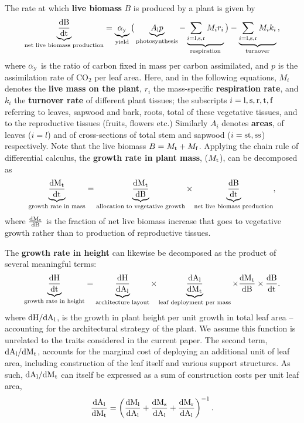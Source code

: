\documentclass[a4paper,11pt]{article}
\begin{document}
The rate at which \textbf{live biomass} $B$ is produced by a plant is given by
\begin{equation}\label{eq:eq0}
\underbrace{\frac{\rm{d} B}{\rm{d} t}}_{\text{net live biomass production}} = \underbrace{\alpha_{\rm y}}_{\text{yield}}  \big(\underbrace{A_{\rm l} p}_{\text{photosynthesis}} - \underbrace{\sum_{i = {\rm l,s,r}} M_{i} r_{i}}_{\text{respiration}}\big) - \underbrace{ \sum_{i = \rm{l,s,r}} M_{i} k_{i}}_{\text{turnover}} \, ,
\end{equation}
where $\alpha_{\rm y}$ is the ratio of carbon fixed in mass per carbon assimilated, and $p$ is the assimilation rate of CO$_{2}$ per leaf area. Here, and in the following equations, $M_i$ denotes the \textbf{live mass on the plant}, $r_i$ the mass-specific \textbf{respiration rate}, and $k_i$ the \textbf{turnover rate} of different plant tissues; the subscripts $i = \rm{l,s,r,t,f}$ referring to leaves, sapwood and bark, roots, total of these vegetative tissues, and to the reproductive tissues (fruits, flowers etc.)  Similarly $A_i$ denotes \textbf{areas}, of leaves ($i = l$) and of cross-sections of total stem and sapwood ($i =\rm{st,ss}$) respectively. Note that the live biomass $B = M_{\rm t} + M_{\rm f}$.  Applying the chain rule of differential calculus, the \textbf{growth rate in plant mass}, ($M_{\rm t}$), can be decomposed as
\begin{equation}\label{eq:eq1}
\underbrace{{\frac{\rm{d} M_{\rm t}}{\rm{d} t}}}_{\text{growth rate in mass}} = \underbrace{\frac{\rm{d} M_{\rm t}}{\rm{d} B}}_{\text{allocation to vegetative growth}}  \times \underbrace{\frac{\rm{d} B}{\rm{d} t}}_{\text{net live biomass production}},
\end{equation}
where $\frac{\rm{d} M_{\rm t}}{\rm{d} B}$ is the fraction of net live biomass increase that goes to vegetative growth rather than to production of reproductive tissues.

The \textbf{growth rate in height} can likewise be decomposed as the product of several meaningful terms:
\begin{equation}\label{eq:eq2}
\underbrace{\frac{\rm{d} H}{\rm{d} t}}_{\text{growth rate in height}} = \underbrace{\frac{\rm{d} H}{\rm{d} A_{\rm l}}}_{\text{architecture layout}} \times \underbrace{{\frac{\rm{d} A_{\rm l}}{\rm{d} M_{\rm t}}}}_{\text{leaf deployment per mass}} \times {\frac{\ensuremath{\rm{d}}M_{\rm t}}{\ensuremath{\rm{d}}B}} \times {\frac{\ensuremath{\rm{d}}B}{\ensuremath{\rm{d}}t}}.
\end{equation}
where $\rm{d} H / \rm{d} A_{\rm l}$, is the growth in plant height
per unit growth in total leaf area -- accounting for the architectural
strategy of the plant. We assume this function is unrelated to the traits considered in the current paper. The second term, $\rm{d} A_{\rm l} / \rm{d} M_{\rm t}$,
accounts for the marginal cost of deploying an additional unit of leaf
area, including construction of the leaf itself and various support
structures. As such, $\rm{d} A_{\rm l} / \rm{d} M_{\rm t}$
can itself be expressed as a sum of construction costs per unit leaf
area,
\begin{equation}\label{eq:daldmt}
\frac{\rm{d} A_{\rm l}}{\rm{d} M_{\rm t}}
= \left(\frac{\rm{d} M_{\rm l}}{\rm{d} A_{\rm l}}
 +  \frac{\rm{d} M_{\rm s}}{\rm{d} A_{\rm l}} + \frac{\rm{d} M_{\rm r}}{\rm{d} A_{\rm l}}\right)^{-1}.
\end{equation}
\end{document}
